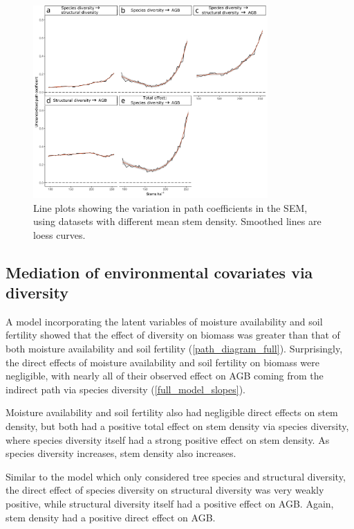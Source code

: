 \documentclass[11pt,a4paper]{article}
\begin{document}
\begin{figure}[H]
\centering
	\includegraphics[width=0.8\textwidth]{sem_struc_stems_ha}
	\caption{Line plots showing the variation in path coefficients in the SEM, using datasets with different mean stem density. Smoothed lines are loess curves.}
	\label{sem_struc_stems_ha}
\end{figure}

\subsection{Mediation of environmental covariates via diversity}

A model incorporating the latent variables of moisture availability and soil fertility showed that the effect of diversity on biomass was greater than that of both moisture availability and soil fertility (\autoref{path_diagram_full}). Surprisingly, the direct effects of moisture availability and soil fertility on biomass were negligible, with nearly all of their observed effect on AGB coming from the indirect path via species diversity (\autoref{full_model_slopes}). 

Moisture availability and soil fertility also had negligible direct effects on stem density, but both had a positive total effect on stem density via species diversity, where species diversity itself had a strong positive effect on stem density. As species diversity increases, stem density also increases. 

Similar to the model which only considered tree species and structural diversity, the direct effect of species diversity on structural diversity was very weakly positive, while structural diversity itself had a positive effect on AGB. Again, stem density had a positive direct effect on AGB.
\end{document}
